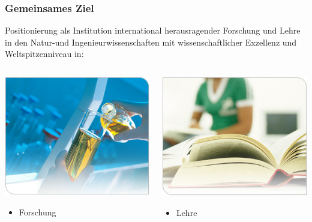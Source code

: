 \documentclass[t]{beamer}
\newlength{\tmplen}
\begin{document}
\begin{frame}
  \frametitle{Gemeinsames Ziel}

  Positionierung als Institution international herausragender Forschung
  und Lehre in den Natur-und Ingenieurwissenschaften mit wissenschaftlicher
  Exzellenz und Weltspitzenniveau in:
  \bigskip

  \setlength{\tmplen}{.2875\linewidth}
  \begin{columns}[onlytextwidth]
    \begin{column}{\tmplen}
      \includegraphics[width=\tmplen]
        {Bilder/KIT-Research}
      \begin{itemize}\item Forschung\end{itemize}
    \end{column}
    \begin{column}{\tmplen}
      \includegraphics[width=\tmplen]
        {Bilder/KIT-Teaching}
      \begin{itemize}\item Lehre\end{itemize}
    \end{column}
\end{columns}
\end{frame}
\end{document}
